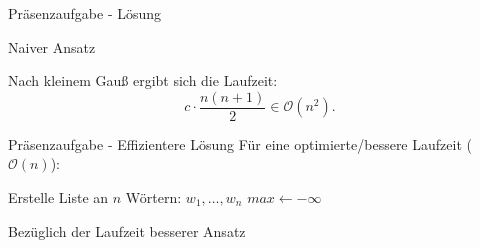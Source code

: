 \begin{frame}{Präsenzaufgabe - Lösung}
\setcounter{algocf}{0}
\begin{center}
\begin{minipage}{0.825\linewidth}
\begin{algorithm}[H]
\PreCode
\StartCode
    \pause{}\pause
    \caption{Naiver Ansatz}
\end{algorithm}
\end{minipage}
\hspace*{-1.8cm}\begin{minipage}{0.2\linewidth}
    \pause\small\color{gray}Nach kleinem Gauß ergibt sich die Laufzeit: \[c \cdot \frac{n(n+1)}{2} \in \mathcal{O}(n^2).\]
    \vfill\hbox{}
\end{minipage}
\end{center}
\end{frame}

\begin{frame}[t]{Präsenzaufgabe - Effizientere Lösung}
    \setcounter{algocf}{1}Für eine optimierte/bessere Laufzeit ($\mathcal{O}(n)$):\pause
\begin{center}
\begin{minipage}{0.75\linewidth}
\begin{algorithm}[H]
\PreCode
\StartCode
    \pause Erstelle Liste an $n$ Wörtern: $w_1, \ldots, w_n$\;
    \pause$max \gets - \infty$\;
    \pause{}
    \pause{}\pause
    \caption{Bezüglich der Laufzeit besserer Ansatz}
\end{algorithm}
\end{minipage}
\end{center}
\end{frame}

\iffull
